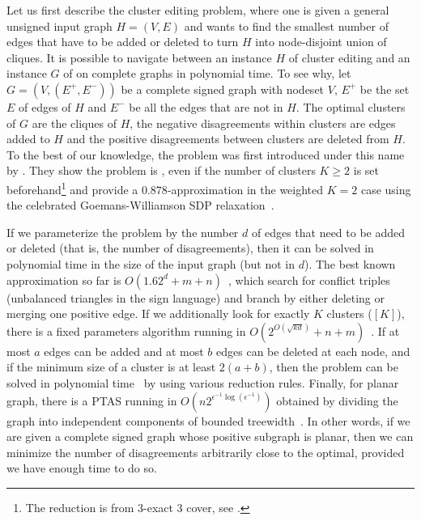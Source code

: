 Let us first describe the cluster editing problem, where one is given a general unsigned input graph
$H=(V,E)$ and wants to
find the smallest number of edges that have to be added or deleted to turn $H$ into node-disjoint
union of cliques. It is possible to navigate between an instance $H$ of cluster editing and an
instance $G$ of \pcc{} on complete graphs in polynomial time. To see why, let $G=(V,(E^+,E^-))$
be a complete signed graph with nodeset $V$, $E^+$ be the set $E$ of edges of $H$ and $E^-$ be all
the edges that are not in $H$. The optimal clusters of $G$ are the cliques of $H$, the negative
disagreements within clusters are edges added to $H$ and the positive disagreements between clusters
are deleted from $H$. To the best of our knowledge, the problem was first introduced under this
name by \textcite{Shamir02}. They show the problem is
\NPc{}, even if the number of clusters $K\geq2$ is set beforehand\footnote{The reduction is from
3-exact 3 cover, see \autocite[Theorems 1, 2 and Corollary 1]{Shamir02}.} and provide a
$0.878$-approximation in the weighted $K=2$ case using the celebrated Goemans-Williamson SDP
relaxation~\autocite{MaxCutSDP95}.

If we parameterize the problem by the number $d$ of edges that need to be added or deleted (that is,
the number of disagreements), then it can be solved in polynomial time in the size of the input
graph (but not in $d$). The best known approximation so far is
$O(1.62^d+m+n)$~\autocite{GoldenCE12}, which search for conflict triples (\ie unbalanced triangles
in the sign language) and branch by either deleting or merging one positive edge. If we additionally
look for exactly $K$ clusters (\ie \mind$[K]$), there is a fixed parameters algorithm running in
$O(2^{O(\sqrt{kd})}+n+m)$~\autocite{Fomin2014}. If at most $a$ edges can be added and at most $b$
edges can be deleted at each node, and if the minimum size of a cluster is at least $2(a+b)$, then
the problem can be solved in polynomial time~\autocite{Abu-Khzam2015} by using various reduction
rules. Finally, for planar graph,
there is a PTAS running in $O(n2^{\epsilon^{-1}\log(\epsilon^{-1})})$ obtained by dividing the graph
into independent components of bounded treewidth~\autocite{PlanarCEPTAS17}. In other words, if we
are given a complete signed graph whose positive subgraph is planar, then we can minimize the number
of disagreements arbitrarily close to the optimal, provided we have enough time to do so.

